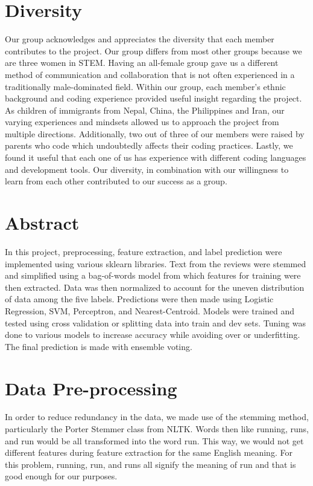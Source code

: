 \documentclass{article}
\begin{document}
\section{Diversity}
Our group acknowledges and appreciates the diversity that each member contributes to the project. Our group differs from most other groups because we are three women in STEM. Having an all-female group gave us a different method of communication and collaboration that is not often experienced in a traditionally male-dominated field. Within our group, each member's ethnic background and coding experience provided useful insight regarding the project. As children of immigrants from Nepal, China, the Philippines and Iran, our varying experiences and mindsets allowed us to approach the project from multiple directions. Additionally, two out of three of our members were raised by parents who code which undoubtedly affects their coding practices. Lastly, we found it useful that each one of us has experience with different coding languages and development tools. Our diversity, in combination with our willingness to learn from each other contributed to our success as a group.

\section{Abstract}
In this project, preprocessing, feature extraction, and label prediction were implemented using various sklearn libraries. Text from the reviews were stemmed and simplified using a bag-of-words model from which features for training were then extracted. Data was then normalized to account for the uneven distribution of data among the five labels. Predictions were then made using Logistic Regression, SVM, Perceptron, and Nearest-Centroid. Models were trained and tested using cross validation or splitting data into train and dev sets. Tuning was done to various models to increase accuracy while avoiding over or underfitting. The final prediction is made with ensemble voting. 

\section{Data Pre-processing}
In order to reduce redundancy in the data, we made use of the stemming method, particularly the Porter Stemmer class from NLTK. Words then like running, runs, and run would be all transformed into the word run. This way, we would not get different features during feature extraction for the same English meaning. For this problem, running, run, and runs all signify the meaning of run and that is good enough for our purposes. 
\end{document}
